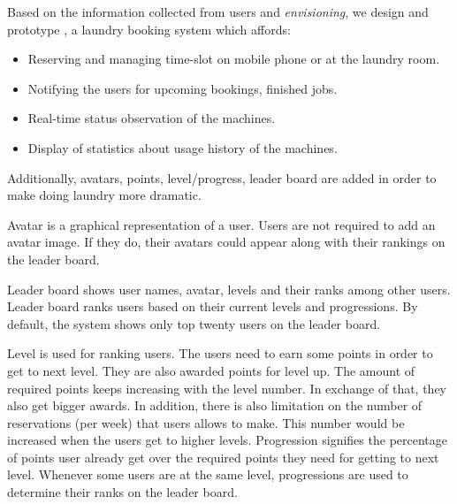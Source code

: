 Based on the information collected from users and \emph{envisioning}, we design and prototype {\toolname}, a laundry booking system which affords:
\begin{itemize}
\item Reserving and managing time-slot on mobile phone or at the laundry room.
\item Notifying the users for upcoming bookings, finished jobs.
\item Real-time status observation of the machines.
\item Display of statistics about usage history of the machines.
\end{itemize}
Additionally, avatars, points, level/progress, leader board are added in order to make doing laundry more dramatic.

Avatar is a graphical representation of a user. Users are not required to add an avatar image. If they do, their avatars could appear along with their rankings on the leader board. 

Leader board shows user names, avatar, levels and their ranks among other users. Leader board ranks users based on their current levels and progressions. By default, the system shows only top twenty users on the leader board.

Level is used for ranking users. The users need to earn some points in order to get to next level. They are also awarded points for level up. The amount of required points keeps increasing with the level number. In exchange of that, they also get bigger awards. In addition, there is also limitation on the number of reservations (per week) that users allows to make. This number would be increased when the users get to higher levels. Progression signifies the percentage of points user already get over the required points they need for getting to next level. Whenever some users are at the same level, progressions are used to determine their ranks on the leader board.
 
